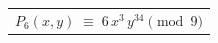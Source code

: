 \documentclass[12pt,border=4pt]{standalone}
\begin{document}
\color[HTML]{1F2A3A}
\begin{tabular}{@{}c@{}}$\displaystyle P_6(x,y)\;\equiv\;6\,x^{3}\,y^{34}\pmod 9$\end{tabular}
\end{document}
